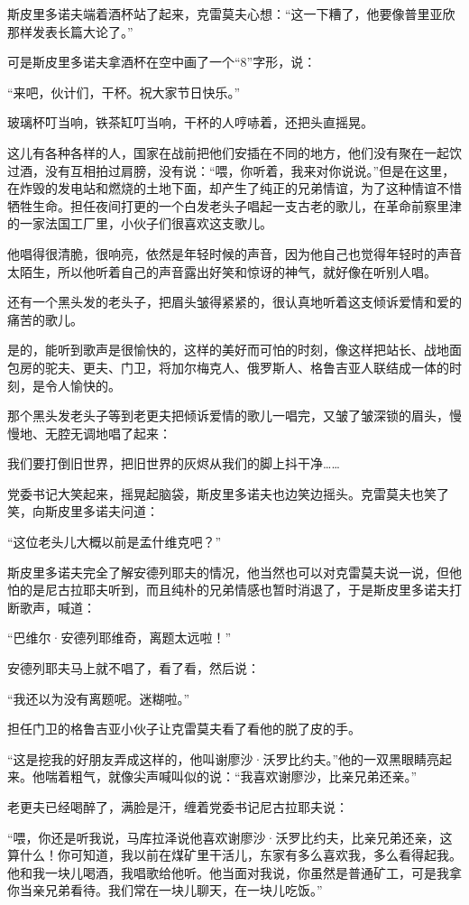 斯皮里多诺夫端着酒杯站了起来，克雷莫夫心想：“这一下糟了，他要像普里亚欣那样发表长篇大论了。”

可是斯皮里多诺夫拿酒杯在空中画了一个“8”字形，说：

“来吧，伙计们，干杯。祝大家节日快乐。”

玻璃杯叮当响，铁茶缸叮当响，干杯的人哼哧着，还把头直摇晃。

这儿有各种各样的人，国家在战前把他们安插在不同的地方，他们没有聚在一起饮过酒，没有互相拍过肩膀，没有说：“喂，你听着，我来对你说说。”但是在这里，在炸毁的发电站和燃烧的土地下面，却产生了纯正的兄弟情谊，为了这种情谊不惜牺牲生命。担任夜间打更的一个白发老头子唱起一支古老的歌儿，在革命前察里津的一家法国工厂里，小伙子们很喜欢这支歌儿。

他唱得很清脆，很响亮，依然是年轻时候的声音，因为他自己也觉得年轻时的声音太陌生，所以他听着自己的声音露出好笑和惊讶的神气，就好像在听别人唱。

还有一个黑头发的老头子，把眉头皱得紧紧的，很认真地听着这支倾诉爱情和爱的痛苦的歌儿。

是的，能听到歌声是很愉快的，这样的美好而可怕的时刻，像这样把站长、战地面包房的驼夫、更夫、门卫，将加尔梅克人、俄罗斯人、格鲁吉亚人联结成一体的时刻，是令人愉快的。

那个黑头发老头子等到老更夫把倾诉爱情的歌儿一唱完，又皱了皱深锁的眉头，慢慢地、无腔无调地唱了起来：

我们要打倒旧世界，把旧世界的灰烬从我们的脚上抖干净……

党委书记大笑起来，摇晃起脑袋，斯皮里多诺夫也边笑边摇头。克雷莫夫也笑了笑，向斯皮里多诺夫问道：

“这位老头儿大概以前是孟什维克吧？”

斯皮里多诺夫完全了解安德列耶夫的情况，他当然也可以对克雷莫夫说一说，但他怕的是尼古拉耶夫听到，而且纯朴的兄弟情感也暂时消退了，于是斯皮里多诺夫打断歌声，喊道：

“巴维尔·安德列耶维奇，离题太远啦！”

安德列耶夫马上就不唱了，看了看，然后说：

“我还以为没有离题呢。迷糊啦。”

担任门卫的格鲁吉亚小伙子让克雷莫夫看了看他的脱了皮的手。

“这是挖我的好朋友弄成这样的，他叫谢廖沙·沃罗比约夫。”他的一双黑眼睛亮起来。他喘着粗气，就像尖声喊叫似的说：“我喜欢谢廖沙，比亲兄弟还亲。”

老更夫已经喝醉了，满脸是汗，缠着党委书记尼古拉耶夫说：

“喂，你还是听我说，马库拉泽说他喜欢谢廖沙·沃罗比约夫，比亲兄弟还亲，这算什么！你可知道，我以前在煤矿里干活儿，东家有多么喜欢我，多么看得起我。他和我一块儿喝酒，我唱歌给他听。他当面对我说，你虽然是普通矿工，可是我拿你当亲兄弟看待。我们常在一块儿聊天，在一块儿吃饭。”

